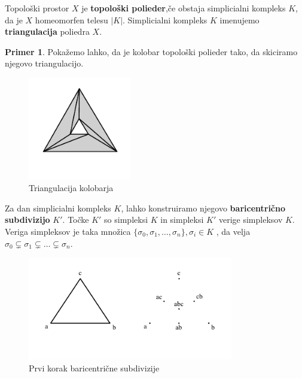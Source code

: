\documentclass[a4paper, 12pt]{book}
\theoremstyle{definition}
\newtheorem{example}{Primer}[section]
\begin{document}
\newpage
Topološki prostor $X$ je \textbf{topološki polieder},če obstaja simplicialni
kompleks $K$, da je $X$ homeomorfen telesu $|K|$. Simplicialni kompleks
$K$ imenujemo \textbf{triangulacija} poliedra $X$.
\begin{example}
  Pokažemo lahko, da je kolobar topološki polieder tako, da skiciramo njegovo
  triangulacijo.
    \begin{figure}[h]
        \begin{center}
        \includegraphics[width=0.4\textwidth]{torus-simpleks.pdf}
        \end{center}
        \caption{Triangulacija kolobarja}
    \end{figure}
\end{example}
Za dan simplicialni kompleks $K$, lahko konstruiramo njegovo \textbf{baricentrično subdivizijo} $K'$.
Točke $K'$ so simpleksi $K$ in simpleksi $K'$ verige simpleksov $K$. Veriga
simpleksov je taka množica $\{\sigma_0,\sigma_1,\dots,\sigma_n\}, \sigma_i \in K$
, da velja $\sigma_0 \subsetneq \sigma_1 \subsetneq \dots \subsetneq \sigma_n$.
\newpage
\begin{figure}[h]
  \begin{center}
  \includegraphics[width=0.8\textwidth]{baricentricna1.pdf}
  \end{center}
  \caption{Prvi korak baricentrične subdivizije}
  \label{baricent1}
\end{figure}
\end{document}
